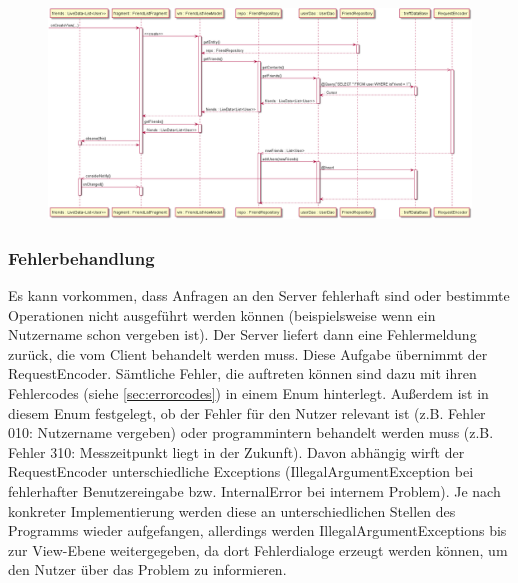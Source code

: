 \documentclass[parskip=full,11pt]{scrartcl}
\begin{document}
\begin{figure}
	\centering
	\includegraphics[width = \paperheight / 30 * 19, angle = 90]{datafetch.png}
	\label{fig:datafetch}
\end{figure}


\subsubsection{Fehlerbehandlung} \label{sec:error}

Es kann vorkommen, dass Anfragen an den Server fehlerhaft sind oder bestimmte
Operationen nicht ausgeführt werden können (beispielsweise wenn ein Nutzername
schon vergeben ist). Der Server liefert dann eine Fehlermeldung zurück, die vom
Client behandelt werden muss. Diese Aufgabe übernimmt der RequestEncoder.
Sämtliche Fehler, die auftreten können sind dazu mit ihren Fehlercodes (siehe
\ref{sec:errorcodes}) in einem Enum hinterlegt. Außerdem ist in diesem Enum
festgelegt, ob der Fehler für den Nutzer relevant ist (z.B. Fehler 010:
Nutzername vergeben) oder programmintern behandelt werden muss (z.B. Fehler
310: Messzeitpunkt liegt in der Zukunft). Davon abhängig wirft der
RequestEncoder unterschiedliche Exceptions (IllegalArgumentException bei
fehlerhafter Benutzereingabe bzw. InternalError bei internem Problem). Je nach
konkreter Implementierung werden diese an unterschiedlichen Stellen des
Programms wieder aufgefangen, allerdings werden IllegalArgumentExceptions bis
zur View-Ebene weitergegeben, da dort Fehlerdialoge erzeugt werden können, um
den Nutzer über das Problem zu informieren.
\end{document}
